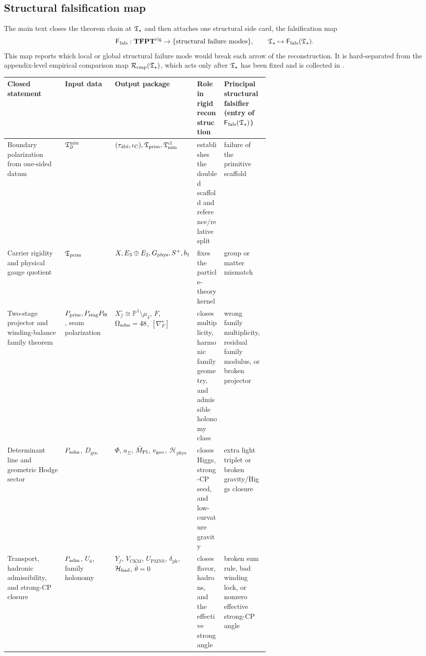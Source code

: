 \subsection{Structural falsification map}
\label{sec:structural-falsification-map}

The main text closes the theorem chain at $\mathfrak T_{\star}$ and then attaches one structural side card,
the falsification map
\[
\mathsf F_{\mathrm{fals}}:\mathbf{TFPT}^{\mathrm{rig}}\to\{\text{structural failure modes}\},
\qquad
\mathfrak T_{\star}\mapsto \mathsf F_{\mathrm{fals}}(\mathfrak T_{\star}).
\]
This map reports which local or global structural failure mode would break each arrow of the
reconstruction. It is hard-separated from the appendix-level empirical comparison map
$\mathcal R_{\mathrm{cmp}}(\mathfrak T_{\star})$, which acts only after $\mathfrak T_{\star}$ has been fixed and is collected in
.

\begin{table}[p]
\centering
\scriptsize
\setlength{\tabcolsep}{2pt}
\renewcommand{\arraystretch}{0.95}
\begin{tabularx}{\linewidth}{@{}>{\raggedright\arraybackslash}p{0.22\linewidth}>{\raggedright\arraybackslash}p{0.18\linewidth}>{\raggedright\arraybackslash}p{0.22\linewidth}YY@{}}
\toprule
Closed statement & Input data & Output package & Role in rigid reconstruction & Principal structural falsifier (entry of $\mathsf F_{\mathrm{fals}}(\mathfrak T_{\star})$) \\
\midrule
Boundary polarization from one-sided datum & $\mathfrak T_{\partial}^{\min}$ & $(\tau_{\mathrm{dbl}},\iota_{\mathrm C}),\mathfrak T_{\mathrm{prim}},\mathfrak T_{\mathrm{min}}^{\mathrm{cl}}$ & establishes the doubled scaffold and reference/relative split & failure of the primitive scaffold \\
Carrier rigidity and physical gauge quotient & $\mathfrak T_{\mathrm{prim}}$ & $X,E_3\oplus E_2,G_{\mathrm{phys}},S^+,b_1$ & fixes the particle-theory kernel & group or matter mismatch \\
Two-stage projector and winding-balance family theorem & $P_{\mathrm{prim}},P_{\mathrm{sing}}P_\Theta$, seam polarization & $X_f^\circ\cong\mathbb P^1\setminus\mu_4$, $F$, $\Omega_{\mathrm{adm}}=48$, $[\nabla_F^\star]$ & closes multiplicity, harmonic family geometry, and admissible holonomy class & wrong family multiplicity, residual family modulus, or broken projector \\
Determinant line and geometric Hodge sector & $P_{\mathrm{adm}}$, $D_{\mathrm{geo}}$ & $\Phi$, $a_\Sigma$, $\bar M_{\mathrm{Pl}}$, $v_{\mathrm{geo}}$, $\mathcal H_{\mathrm{phys}}$ & closes Higgs, strong-CP seed, and low-curvature gravity & extra light triplet or broken gravity/Higgs closure \\
Transport, hadronic admissibility, and strong-CP closure & $P_{\mathrm{adm}}$, $U_6$, family holonomy & $Y_f$, $V_{\mathrm{CKM}}$, $U_{\mathrm{PMNS}}$, $\delta_{\mathrm{ph}}$, $\mathcal H_{\mathrm{had}}$, $\bar\theta=0$ & closes flavor, hadrons, and the effective strong angle & broken sum rule, bad winding lock, or nonzero effective strong-CP angle \\

\end{tabularx}
\end{table}
